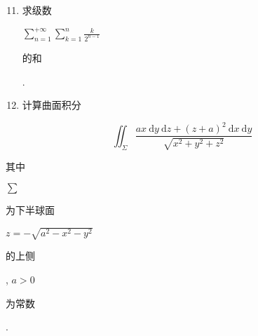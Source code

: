 \documentclass[10pt]{article}
\begin{document}
\begin{enumerate}
  \setcounter{enumi}{10}
  \item \begin{CJK}{UTF8}{mj}求级数\end{CJK} $\sum_{n=1}^{+\infty} \sum_{k=1}^{n} \frac{k}{2^{n-1}}$ \begin{CJK}{UTF8}{mj}的和\end{CJK}.

  \item \begin{CJK}{UTF8}{mj}计算曲面积分\end{CJK}

\end{enumerate}
$$
\iint_{\Sigma} \frac{a x \mathrm{~d} y \mathrm{~d} z+(z+a)^{2} \mathrm{~d} x \mathrm{~d} y}{\sqrt{x^{2}+y^{2}+z^{2}}}
$$
\begin{CJK}{UTF8}{mj}其中\end{CJK} $\sum$ \begin{CJK}{UTF8}{mj}为下半球面\end{CJK} $z=-\sqrt{a^{2}-x^{2}-y^{2}}$ \begin{CJK}{UTF8}{mj}的上侧\end{CJK}, $a>0$ \begin{CJK}{UTF8}{mj}为常数\end{CJK}.
\end{document}
